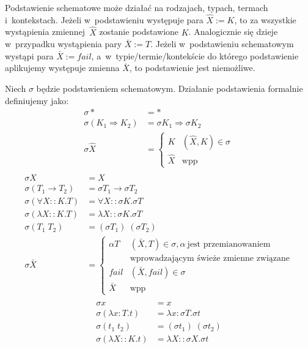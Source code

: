 \documentclass[11pt,leqno]{article}
\begin{document}
\begin{definicja}
Podstawienie schematowe może działać na rodzajach, typach, termach i~kontekstach. Jeżeli w~podstawieniu występuje
para $\widehat{X} := K$, to za wszystkie wystąpienia zmiennej~$\widehat{X}$ zostanie podstawione $K$. Analogicznie
się dzieje w~przypadku wystąpienia pary $\bar{X} := T$. Jeżeli w~podstawieniu schematowym wystąpi para $\bar{X} := fail$,
a~w~typie/termie/kontekście do którego podstawienie aplikujemy występuje zmienna $\bar{X}$, to podstawienie jest niemożliwe.

Niech $\sigma$ będzie podstawieniem schematowym. Działanie podstawienia formalnie definiujemy jako:
\begin{align*}
\sigma * & = * \\
\sigma (K_1 \Rightarrow K_2) & = \sigma K_1 \Rightarrow \sigma K_2 \\
\sigma \widehat{X} & = 
	\begin{cases}
		K & (\widehat{X},K) \in \sigma \\
		\widehat{X} & \textrm{wpp}
	\end{cases} \\
\end{align*}
\begin{align*}
\sigma X & = X \\
\sigma(T_1 \to T_2) & = \sigma T_1 \to \sigma T_2 \\
\sigma(\forall X :: K.T) & = \forall X :: \sigma K. \sigma T \\
\sigma(\lambda X :: K.T) & = \lambda X :: \sigma K. \sigma T \\
\sigma(T_1 \; T_2) & = (\sigma T_1) \; (\sigma T_2) \\
\sigma \bar{X} & = 
	\begin{cases}
		\alpha T & (\bar{X},T) \in \sigma, \alpha \ \textrm{jest przemianowaniem} \\
		& \textrm{wprowadzającym świeże zmienne związane} \\
		fail & (\bar{X},fail) \in \sigma \\
		\bar{X} & \textrm{wpp}
	\end{cases} \\
\end{align*}
\begin{align*}
\sigma x & = x \\
\sigma (\lambda x : T.t) & = \lambda x : \sigma T. \sigma t \\
\sigma (t_1 \; t_2) & = (\sigma t_1) \; (\sigma t_2) \\
\sigma (\lambda X :: K. t) & = \lambda X :: \sigma X . \sigma t \\

\end{align*}
\end{definicja}
\end{document}
